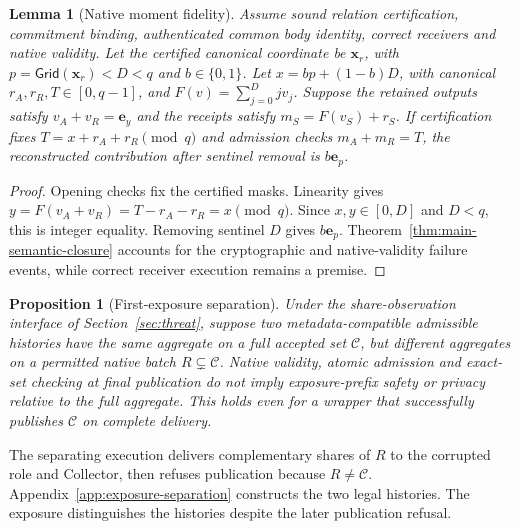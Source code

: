 \documentclass[conference,compsoc]{IEEEtran}
\theoremstyle{definition}
\numberwithin{equation}{section}
\numberwithin{table}{section}
\numberwithin{figure}{section}
\theoremstyle{plain}
\newtheorem{lemma}{Lemma}[section]
\newtheorem{proposition}{Proposition}[section]
\newtheorem{lemma}{Lemma}
\newtheorem{proposition}{Proposition}
\begin{document}
\begin{lemma}[Native moment fidelity]
\label{lem:native-moment-fidelity}
Assume sound relation certification, commitment binding, authenticated common
body identity, correct receivers and native validity. Let the certified
canonical coordinate be \(\mathbf x_r\), with \(p=\mathsf{Grid}(\mathbf x_r)<D<q\)
and \(b\in\{0,1\}\). Let \(x=bp+(1-b)D\), with canonical
\(r_A,r_R,T\in[0,q-1]\), and \(F(v)=\sum_{j=0}^{D}jv_j\). Suppose the
retained outputs satisfy \(v_A+v_R=\mathbf e_y\) and the receipts satisfy
\(m_S=F(v_S)+r_S\).
If certification fixes \(T=x+r_A+r_R\pmod q\) and admission checks
\(m_A+m_R=T\), the reconstructed contribution after sentinel removal is
\(b\mathbf e_p\).
\end{lemma}
\begin{proof}
Opening checks fix the certified masks. Linearity gives
\(y=F(v_A+v_R)=T-r_A-r_R=x\pmod q\).
Since \(x,y\in[0,D]\) and \(D<q\), this is integer equality.
Removing sentinel \(D\) gives \(b\mathbf e_p\). Theorem~\ref{thm:main-semantic-closure}
accounts for the cryptographic and native-validity failure events, while
correct receiver execution remains a premise.
\end{proof}

\begin{proposition}[First-exposure separation]
\label{prop:exposure-separation}
Under the share-observation interface of Section~\ref{sec:threat}, suppose
two metadata-compatible admissible histories have the same aggregate
on a full accepted set \(\mathcal C\), but different aggregates on a permitted native
batch \(R\subsetneq\mathcal C\). Native validity, atomic admission and exact-set
checking at final publication do not imply exposure-prefix safety or privacy
relative to the full aggregate. This holds even for a wrapper that successfully
publishes \(\mathcal C\) on complete delivery.
\end{proposition}
The separating execution delivers complementary shares of \(R\) to the
corrupted role and Collector, then refuses publication because \(R\ne\mathcal C\).
Appendix~\ref{app:exposure-separation} constructs the two legal histories.
The exposure distinguishes the histories despite the later publication refusal.
\end{document}
